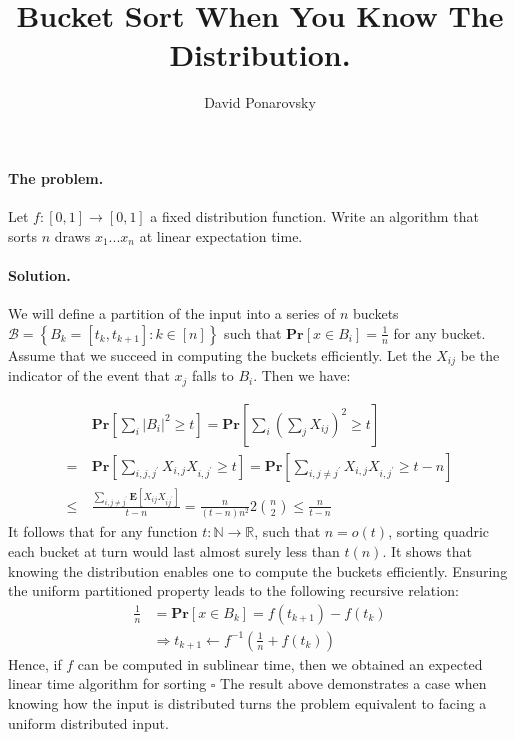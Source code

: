 \documentclass{article}
\newcommand{\prb}[1]{ \mathbf{Pr} \left[ {#1} \right]}
\newcommand{\expp}[1]{ \mathbf{E} \left[ {#1} \right]}
\newcommand{\xij} { X_{ij} }
\begin{document}
\title{Bucket Sort When You Know The Distribution.} 
\author{David Ponarovsky}
\maketitle
{} 
\begin{multicols*}{2}

  \paragraph{The problem.} Let $f: [0,1] \rightarrow [0,1]$ a fixed distribution function. Write an algorithm that sorts $n$ draws $x_1 ... x_{n}$ at linear expectation time.  
  \paragraph{Solution.} We will define a partition of the input into a series of $n$ buckets $\mathcal{B} = \left\{ B_{k} = [t_{k}, t_{k+1} ]: k \in [n]  \right\}$ such that $ \prb{ x \in B_{i}} = \frac{1}{n}$ for any bucket. Assume that we succeed in computing the buckets efficiently. Let the $\xij$ be the indicator of the event that $x_{j}$ falls to $B_i$. Then we have:

  \begin{equation*}
    \begin{split}
      & \ \prb{\sum_{i}{|B_{i}|^{2}} \ge t} = \prb{ \sum_{i}{\left( \sum_{j}X_{ij} \right)^{2}} \ge t   } \\
     = & \ \prb{ \sum_{i,j,j^{\prime}}{X_{i,j}X_{i,j^{\prime}} } \ge t  } = \prb{ \sum_{i,j\neq j^{\prime}}{X_{i,j}{X_{i,j^{\prime}} } \ge t - n   } }\\ 
    \le & \ \frac{\sum_{i,j\neq j^{\prime}}{\expp{ X_{ij}X_{ij^{\prime}}  }}}{ t - n  } = \frac{n}{\left(t-n \right)n^{2}}2\binom{n}{2}  \le \frac{n}{t-n}  
    \end{split}
  \end{equation*}
  It follows that for any function $t: \mathbb{N} \rightarrow \mathbb{R}$, such that $n = o\left( t \right)$, sorting quadric each bucket at turn would last almost surely less than $t(n)$.  
  It shows that knowing the distribution enables one to compute the buckets efficiently. Ensuring the uniform partitioned property leads to the following recursive relation: 
  \begin{equation*}
    \begin{split}
      \frac{1}{n} &= \prb{ x \in B_{k} } = f\left( t_{k+1} \right)- f\left( t_{k} \right) \\
      & \Rightarrow t_{k+1} \leftarrow f^{-1}\left( \frac{1}{n} + f\left( t_{k} \right) \right) 
    \end{split}
  \end{equation*} 
  Hence, if $f$ can be computed in sublinear time, then we obtained an expected linear time algorithm for sorting $\square$
  The result above demonstrates a case when knowing how the input is distributed turns the problem equivalent to facing a uniform distributed input.     
\end{multicols*}
\printbibliography 
\end{document}
